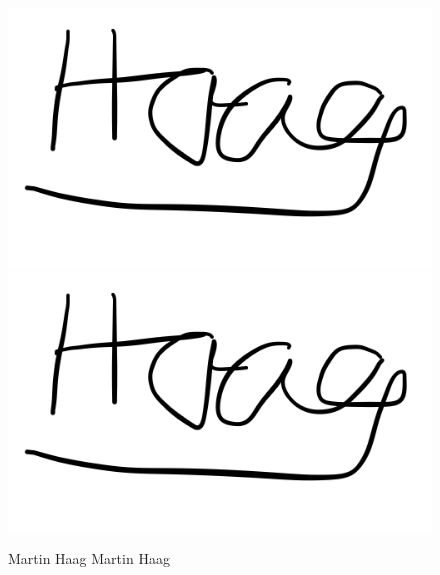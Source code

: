 \begin{figure} [h]
\begin{minipage}[t]{0.4\textwidth}
\vspace{0pt}
\includegraphics[scale =0.3]{images/sign_haag}

\end{minipage}
\hspace{0.1\textwidth}
\begin{minipage}[t]{0.4\textwidth}
\vspace{0pt}
\includegraphics[scale =0.3]{images/sign_haag}

\end{minipage}

\vspace{5pt}
Martin Haag	\hspace{12em} Martin Haag
\end{figure}